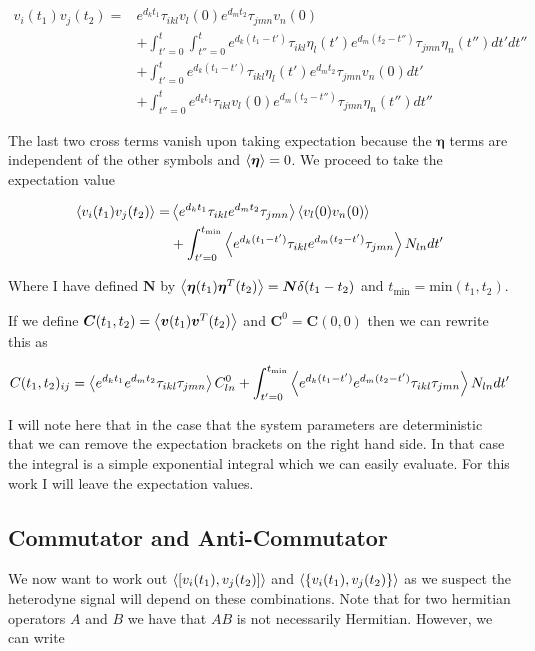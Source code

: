 \documentclass[12pt]{article}
\newcommand{\bv}[1]{\boldsymbol{#1}}
\begin{document}
\begin{align}
v_i(t_1)v_j(t_2) = &e^{d_k t_1}\tau_{ikl} v_{l}(0) e^{d_m t_2}\tau_{jmn}v_{n}(0)\\
&+\int_{t'=0}^t \int_{t''=0}^t e^{d_k (t_1-t')}\tau_{ikl} \eta_{l}(t') e^{d_m (t_2-t'')}\tau_{jmn}\eta_{n}(t'')dt'dt''\\
&+ \int_{t'=0}^t e^{d_k (t_1-t')}\tau_{ikl} \eta_{l}(t')e^{d_m t_2}\tau_{jmn}v_{n}(0) dt'\\
&+ \int_{t''=0}^t e^{d_k t_1}\tau_{ikl} v_{l}(0) e^{d_m (t_2-t'')}\tau_{jmn}\eta_{n}(t'')dt''
\end{align}

The last two cross terms vanish upon taking expectation because the $\bv{\eta}$ terms are independent of the other symbols and $\Braket{\bv{\eta}} = 0$.
We proceed to take the expectation value

\begin{align}
\Braket{v_i(t_1)v_j(t_2)} = &\Braket{e^{d_k t_1}\tau_{ikl} e^{d_m t_2}\tau_{jmn}}\Braket{v_l(0)v_n(0)}\\
&+\int_{t'=0}^{t_{\text{min}}} \Braket{e^{d_k (t_1-t')}\tau_{ikl} e^{d_m (t_2-t')}\tau_{jmn}}N_{ln}dt'
\end{align}

Where I have defined $\bv{N}$ by $\Braket{\bv{\eta}(t_1)\bv{\eta}^T(t_2)} = \bv{N}\delta(t_1-t_2)$ and $t_{\text{min}} = \text{min}(t_1,t_2)$.

If we define $\bv{C}(t_1,t_2) = \Braket{\bv{v}(t_1)\bv{v}^T(t_2)}$ and $\bv{C}^0 = \bv{C}(0,0)$ then we can rewrite this as

\begin{align}
C(t_1,t_2)_{ij} = \Braket{e^{d_k t_1}e^{d_m t_2} \tau_{ikl}\tau_{jmn}} C^0_{ln} +\int_{t'=0}^{t_{\text{min}}}\Braket{e^{d_k (t_1-t')}e^{d_m (t_2-t')} \tau_{ikl}\tau_{jmn}} N_{ln} dt'
\end{align}

I will note here that in the case that the system parameters are deterministic that we can remove the expectation brackets on the right hand side. In that case the integral is a simple exponential integral which we can easily evaluate. For this work I will leave the expectation values.


\subsection{Commutator and Anti-Commutator}

We now want to work out $\Braket{[v_i(t_1),v_j(t_2)]}$ and $\Braket{\{v_i(t_1),v_j(t_2)\}}$ as we suspect the heterodyne signal will depend on these combinations. Note that for two hermitian operators $A$ and $B$ we have that $AB$ is not necessarily Hermitian. However, we can write
\end{document}
